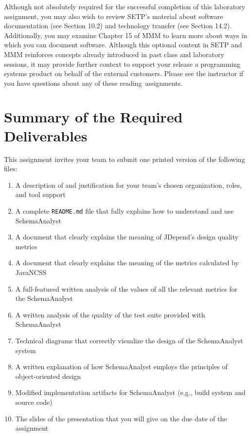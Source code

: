 Although not absolutely required for the successful completion of this laboratory assignment, you may also wish to
review SETP's material about software documentation (see Section 10.2) and technology transfer (see Section 14.2).
Additionally, you may examine Chapter 15 of MMM to learn more about ways in which you can document software. Although
this optional content in SETP and MMM reinforces concepts already introduced in past class and laboratory sessions, it
may provide further context to support your release a programming systems product on behalf of the external customers.
Please see the instructor if you have questions about any of these \mbox{reading assignments}.

\section*{Summary of the Required Deliverables}

This assignment invites your team to submit one printed version of the following files:

\vspace*{-.1in}
\begin{enumerate}
    \itemsep0em
    \item A description of and justification for your team's chosen organization, roles, and tool support
    \item A complete {\tt README.md} file that fully explains how to understand and use SchemaAnalyst
    \item A document that clearly explains the meaning of JDepend's design quality metrics
    \item A document that clearly explains the meaning of the metrics calculated by JavaNCSS
    \item A full-featured written analysis of the values of all the relevant metrics for the SchemaAnalyst
    \item A written analysis of the quality of the test suite provided with SchemaAnalyst
    \item Technical diagrams that correctly visualize the design of the SchemaAnalyst system
    \item A written explanation of how SchemaAnalyst employs the principles of object-oriented design
    \item Modified implementation artifacts for SchemaAnalyst (e.g., build system and source code)
    \item The slides of the presentation that you will give on the due date of the assignment
\end{enumerate}
\vspace*{-.1in}


\printbibliography[filter=papers,title={References}]



